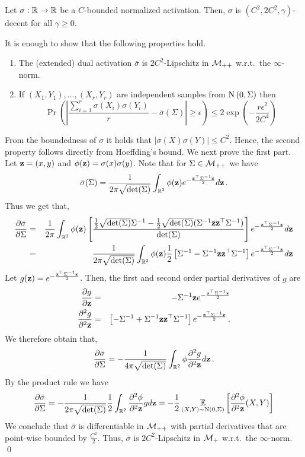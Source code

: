 \begin{lemma}
	\label{lem:bounded_are_decent}
Let $\sigma:{\mathbb R}\to{\mathbb R}$ be a $C$-bounded normalized activation. Then,
$\sigma$ is $(C^2,2C^2,\gamma)$-decent for all $\gamma \ge 0$.
\end{lemma}
\proof
It is enough to show that the following properties hold.
\begin{enumerate}
\item The (extended) dual activation $\bar\sigma$ is $2C^2$-Lipschitz in
	${\cal M}_{++}$ w.r.t.\ the $\infty$-norm.
\item If $(X_1,Y_1),\ldots,(X_r,Y_r)$ are
 independent samples from $\text{N}\left(0,\Sigma\right)$ then
\[
\Pr\left(\left|\frac{\sum_{i=1}^r\sigma(X_i)\sigma(Y_i)}{r}-\bar\sigma(\Sigma)\right|\ge\epsilon\right) \le 2\exp\left(-\frac{r\epsilon^2}{2C^4}\right)
\]
\end{enumerate}
\noindent
From the boundedness of $\sigma$ it holds that $|\sigma(X)\sigma(Y)| \leq
C^2$. Hence, the second property follows directly from Hoeffding's bound.
We next prove the first part. Let ${\mathbf z}=(x,y)$ and
$\phi({\mathbf z}) = \sigma(x)\sigma(y)$. Note that for
$\Sigma\in{\cal M}_{++}$ we have
$$\bar\sigma(\Sigma) =
	\frac{1}{2\pi\sqrt{\det(\Sigma)}}
	\int_{{\mathbb R}^2}\phi({\mathbf z})e^{-\frac{{\mathbf z}^\top\Sigma^{-1}{\mathbf z}}{2}}d{\mathbf z} \,.$$
Thus we get that,
\begin{eqnarray*}
\frac{\partial \bar\sigma}{\partial \Sigma} &=&
	\frac{1}{2\pi}\int_{{\mathbb R}^2}
		\phi({\mathbf z})\left[
			\frac{\frac{1}{2}\sqrt{\det(\Sigma)}\Sigma^{-1} -
				\frac{1}{2}\sqrt{\det(\Sigma)}(\Sigma^{-1}{\mathbf z}{\mathbf z}^\top\Sigma^{-1})}
				{\det(\Sigma)}
						\right]
		e^{-\frac{{\mathbf z}^\top\Sigma^{-1}{\mathbf z}}{2}}d{\mathbf z}
\\
&=& \frac{1}{2\pi\sqrt{\det(\Sigma)}}\int_{{\mathbb R}^2}\phi({\mathbf z})\frac{1}{2}\left[
\Sigma^{-1}-\Sigma^{-1}{\mathbf z}{\mathbf z}^\top\Sigma^{-1}
\right]e^{-\frac{{\mathbf z}^\top\Sigma^{-1}{\mathbf z}}{2}}d{\mathbf z}
\end{eqnarray*}
Let $g({\mathbf z})=e^{-\frac{{\mathbf z}^\top\Sigma^{-1}{\mathbf z}}{2}}$. Then, the first and second
order partial derivatives of $g$ are
\begin{eqnarray*}
\frac{\partial g}{\partial {\mathbf z}} & = &
	-\Sigma^{-1}{\mathbf z} e^{-\frac{{\mathbf z}^\top\Sigma^{-1}{\mathbf z}}{2}} \\
\frac{\partial^2 g}{\partial^2 {\mathbf z}} & = &
	\left[-\Sigma^{-1} +
		\Sigma^{-1}{\mathbf z}{\mathbf z}^\top\Sigma^{-1}\right]e^{-\frac{{\mathbf z}^\top\Sigma^{-1}{\mathbf z}}{2}} \,.
\end{eqnarray*}
We therefore obtain that,
\[
\frac{\partial \bar\sigma}{\partial \Sigma} =
	-\frac{1}{4\pi\sqrt{\det(\Sigma)}} \int_{{\mathbb R}^2}
		\phi\frac{\partial^2 g}{\partial^2 {\mathbf z}} d{\mathbf z} \,.
\]
By the product rule we have
\[
\frac{\partial \bar\sigma}{\partial \Sigma} =
-\frac{1}{2\pi\sqrt{\det(\Sigma)}}\frac{1}{2}\int_{{\mathbb R}^2}\frac{\partial^2
\phi}{\partial^2 {\mathbf z}} gd{\mathbf z} = -\frac{1}{2}\operatorname*{\mathbb{E}}_{(X,Y)\sim\text{N}(0,\Sigma)}\left[\frac{\partial^2 \phi}{\partial^2 {\mathbf z}}(X,Y)\right]
\]
We conclude that $\bar\sigma$ is differentiable in ${\cal M}_{++}$ with
partial derivatives that are point-wise bounded by $\frac{C^2}{2}$. Thus,
$\bar\sigma$ is $2C^2$-Lipschitz in ${\cal M}_+$ w.r.t.\ the $\infty$-norm. \qed

